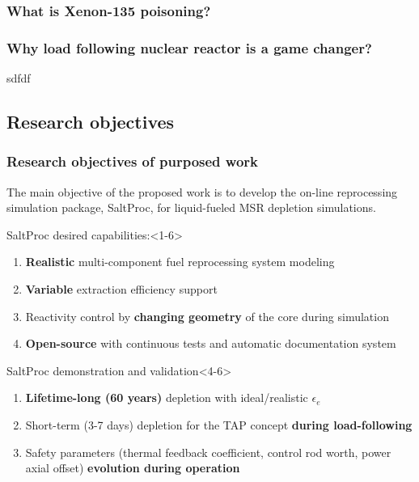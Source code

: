 \begin{frame}
\frametitle{What is Xenon-135 poisoning?}
\end{frame}

\begin{frame}
\frametitle{Why load following nuclear reactor is a game changer?}
sdfdf
\end{frame}



\subsection{Research objectives}

\begin{frame}
  \frametitle{Research objectives of purposed work}
                  \vspace*{-0.05in}
      The main objective of the proposed work is to develop the on-line  reprocessing simulation package, SaltProc, for liquid-fueled MSR depletion simulations.
     \begin{block}{SaltProc desired capabilities:}<1-6>
         \begin{enumerate}
                \item \textbf{Realistic} multi-component fuel 
                reprocessing 
                system modeling
                \item \textbf{Variable} extraction efficiency support
                \item<2-6> Reactivity control by \textbf{changing geometry} of 
                the core during simulation
                \item<3-6> \textbf{Open-source} with continuous tests and 
                automatic documentation system 
         \end{enumerate}
      \end{block}
            \vspace{-0.1in}
	\begin{block}{SaltProc demonstration and validation}<4-6>
		\begin{enumerate}
			\item<4-6> \textbf{Lifetime-long (60 years)} depletion with ideal/realistic $\epsilon_e$
			\item<5-6> Short-term (3-7 days) depletion for the \gls{TAP} concept \textbf{during load-following}
			\item<6> Safety parameters (thermal feedback coefficient, control rod worth, power 
			axial offset) \textbf{evolution during operation}
		\end{enumerate}
	\end{block}
\end{frame}
